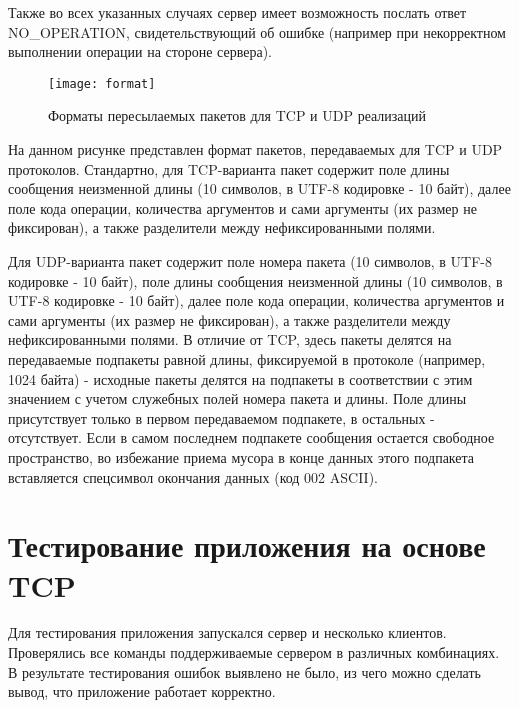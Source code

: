 Также во всех указанных случаях сервер имеет возможность послать ответ NO\_OPERATION, свидетельствующий об ошибке (например при некорректном выполнении операции на стороне сервера).

\begin{figure}[H]
	\begin{center}
		\texttt{[image: format]}
		\caption{Форматы пересылаемых пакетов для TCP и UDP реализаций} 
		\label{pic:format} %
	\end{center}
\end{figure}
На данном рисунке представлен формат пакетов, передаваемых для TCP и UDP протоколов.
Стандартно, для TCP-варианта пакет содержит поле длины сообщения неизменной длины (10 символов, в UTF-8 кодировке - 10 байт), далее поле кода операции, количества аргументов и сами аргументы (их размер не фиксирован), а также разделители между нефиксированными полями.

Для UDP-варианта пакет содержит поле номера пакета (10 символов, в UTF-8 кодировке - 10 байт), поле длины сообщения неизменной длины (10 символов, в UTF-8 кодировке - 10 байт), далее поле кода операции, количества аргументов и сами аргументы (их размер не фиксирован), а также разделители между нефиксированными полями. В отличие от TCP, здесь пакеты делятся на передаваемые подпакеты равной длины, фиксируемой в протоколе (например, 1024 байта) - исходные пакеты делятся на подпакеты в соответствии с этим значением с учетом служебных полей номера пакета и длины. Поле длины присутствует только в первом передаваемом подпакете, в остальных - отсутствует. Если в самом последнем подпакете сообщения остается свободное пространство, во избежание приема мусора в конце данных этого подпакета вставляется спецсимвол окончания данных (код 002 ASCII).


\section{Тестирование приложения на основе TCP}

Для тестирования приложения запускался сервер и несколько клиентов. Проверялись все команды поддерживаемые сервером в различных комбинациях.
	В результате тестирования ошибок выявлено не было, из чего можно сделать вывод, что приложение работает корректно.




